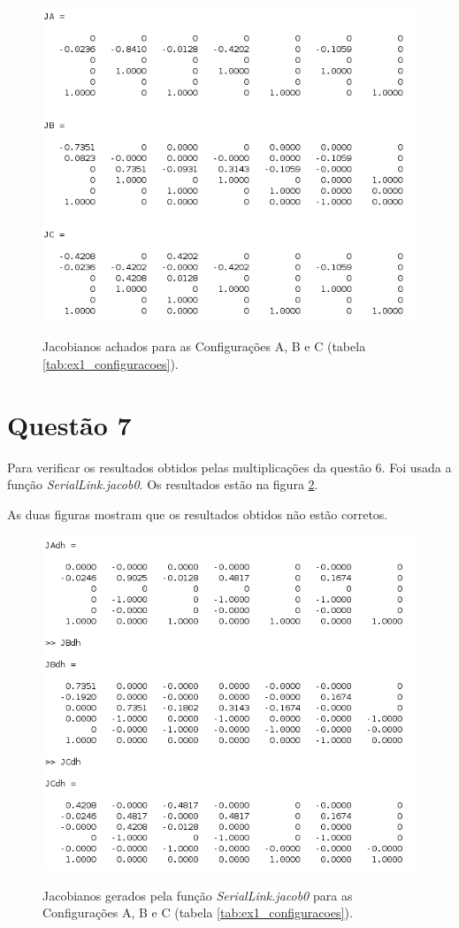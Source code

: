 \documentclass[a4paper,11pt]{article}
\theoremstyle{mytheor}
\begin{document}
\begin{figure}[!ht]
\centering
\caption{Jacobianos achados para as Configurações A, B e C (tabela \ref{tab:ex1_configuracoes}).}
\includegraphics[scale=1]{figs/ex6_jacobs}
\label{fig:ex6_jacobs}
\end{figure}


\section*{Questão 7}

Para verificar os resultados obtidos pelas multiplicações da questão 6. Foi usada a função \textit{SerialLink.jacob0}. Os resultados estão na figura \ref{fig:ex6_verif}.

As duas figuras mostram que os resultados obtidos não estão corretos.

\begin{figure}[!ht]
\centering
\caption{Jacobianos gerados pela função \textit{SerialLink.jacob0} para as Configurações A, B e C (tabela \ref{tab:ex1_configuracoes}).}
\includegraphics[scale=1]{figs/ex7_verif}
\label{fig:ex6_verif}
\end{figure}
\end{document}
